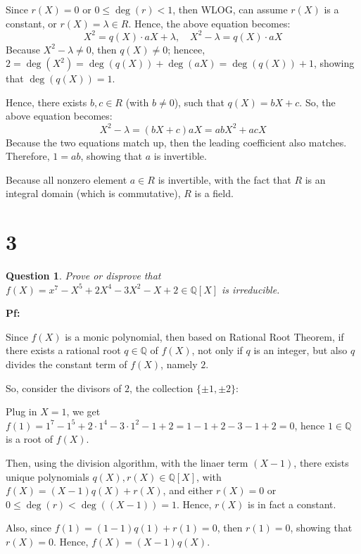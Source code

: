 \documentclass{article}
\newtheorem{question}{Question}
\begin{document}
Since $r(X)=0$ or $0\leq \deg(r)<1$, then WLOG, can assume $r(X)$ is a constant, or $r(X)=\lambda\in R$. Hence, the above equation becomes:
$$X^2=q(X)\cdot aX + \lambda,\quad X^2-\lambda = q(X)\cdot aX$$
Because $X^2-\lambda \neq 0$, then $q(X)\neq 0$; hencee, $2=\deg(X^2) = \deg(q(X))+\deg(aX) = \deg(q(X))+1$, showing that $\deg(q(X))=1$.

Hence, there exists $b,c\in R$ (with $b\neq 0$), such that $q(X)=bX+c$. So, the above equation becomes:
$$X^2-\lambda = (bX+c)aX = abX^2 + acX$$
Because the two equations match up, then the leading coefficient also matches. Therefore, $1 = ab$, showing that $a$ is invertible.

\hfill

Because all nonzero element $a\in R$ is invertible, with the fact that $R$ is an integral domain (which is commutative), $R$ is a field.

\hfill

\hfill

\section*{3}
\begin{myBox}[]{}
    \begin{question}
        Prove or disprove that $f (X) = x^7 -X^5 + 2X^4 -3X^2 -X + 2 \in \mathbb{Q}[X]$ is irreducible.
    \end{question}
\end{myBox}

\textbf{Pf:}

Since $f(X)$ is a monic polynomial, then based on Rational Root Theorem, if there exists a rational root $q\in\mathbb{Q}$ of $f(X)$,
not only if $q$ is an integer, but also $q$ divides the constant term of $f(X)$, namely $2$.

\hfill

So, consider the divisors of $2$, the collection $\{\pm 1,\pm 2\}$:

Plug in $X=1$, we get $f(1)=1^7-1^5+2\cdot 1^4-3\cdot 1^2-1+2 = 1-1+2-3-1+2 = 0$, hence $1\in\mathbb{Q}$ is a root of $f(X)$.

Then, using the division algorithm, with the linaer term $(X-1)$, there exists unique polynomials $q(X),r(X)\in\mathbb{Q}[X]$,
with $f(X)=(X-1)q(X)+r(X)$, and either $r(X)=0$ or $0\leq \deg(r)<\deg((X-1))=1$. Hence, $r(X)$ is in fact a constant.

Also, since $f(1)=(1-1)q(1)+r(1)=0$, then $r(1)=0$, showing that $r(X)=0$. Hence, $f(X)=(X-1)q(X)$.
\end{document}
